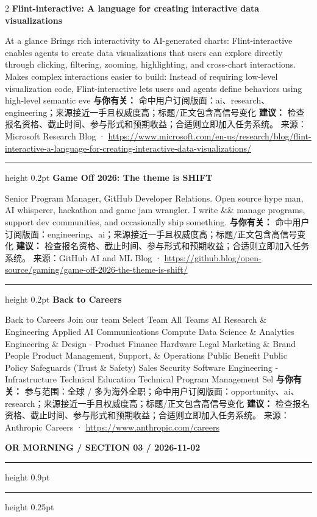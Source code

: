 \documentclass[10.5pt]{ctexart}
\begin{document}
\begin{multicols}{2}
{\large\bfseries Flint-interactive: A language for creating interactive data visualizations}\par
At a glance Brings rich interactivity to AI-generated charts: Flint-interactive enables agents to create data visualizations that users can explore directly through clicking, filtering, zooming, highlighting, and cross-chart interactions. Makes complex interactions easier to build: Instead of requiring low-level visualization code, Flint-interactive lets users and agents define behaviors using high-level semantic eve
\textbf{与你有关：} 命中用户订阅版面：ai、research、engineering；来源接近一手且权威度高；标题/正文包含高信号变化
\textbf{建议：} 检查报名资格、截止时间、参与形式和预期收益；合适则立即加入任务系统。
{\footnotesize\color{ormuted} 来源：Microsoft Research Blog · \url{https://www.microsoft.com/en-us/research/blog/flint-interactive-a-language-for-creating-interactive-data-visualizations/}}
\vspace{2mm}
\hrule height 0.2pt
\vspace{2mm}
{\large\bfseries Game Off 2026: The theme is SHIFT}\par
Senior Program Manager, GitHub Developer Relations. Open source hype man, AI whisperer, hackathon and game jam wrangler. I write \&\& manage programs, support dev communities, and occasionally ship something.
\textbf{与你有关：} 命中用户订阅版面：engineering、ai；来源接近一手且权威度高；标题/正文包含高信号变化
\textbf{建议：} 检查报名资格、截止时间、参与形式和预期收益；合适则立即加入任务系统。
{\footnotesize\color{ormuted} 来源：GitHub AI and ML Blog · \url{https://github.blog/open-source/gaming/game-off-2026-the-theme-is-shift/}}
\vspace{2mm}
\hrule height 0.2pt
\vspace{2mm}
{\large\bfseries Back to Careers}\par
Back to Careers Join our team Select Team All Teams AI Research \& Engineering Applied AI Communications Compute Data Science \& Analytics Engineering \& Design - Product Finance Hardware Legal Marketing \& Brand People Product Management, Support, \& Operations Public Benefit Public Policy Safeguards (Trust \& Safety) Sales Security Software Engineering - Infrastructure Technical Education Technical Program Management Sel
\textbf{与你有关：} 参与范围：全球 / 多为海外全职；命中用户订阅版面：opportunity、ai、research；来源接近一手且权威度高；标题/正文包含高信号变化
\textbf{建议：} 检查报名资格、截止时间、参与形式和预期收益；合适则立即加入任务系统。
{\footnotesize\color{ormuted} 来源：Anthropic Careers · \url{https://www.anthropic.com/careers}}
\end{multicols}
\newpage
{\small\bfseries OR MORNING / SECTION 03 / 2026-11-02}
\vspace{2mm}
\hrule height 0.9pt
\vspace{1.5mm}
\hrule height 0.25pt
\vspace{4mm}
\end{document}
